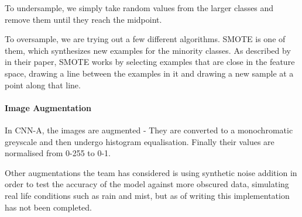 \documentclass[12pt, landscape]{article}
\begin{document}
\begin{multicols}{3}
To undersample, we simply take random values from the larger classes and remove
them until they reach the midpoint.

To oversample, we are trying out a few different algorithms. SMOTE is one of
them, which synthesizes new examples for the minority classes. As described by
\citep[Nitesh Chawla et al]{SMOTE} in their paper, SMOTE works by selecting
examples that are close in the feature space, drawing a line between the
examples in it and drawing a new sample at a point along that
line.


\paragraph{Image Augmentation}
In CNN-A, the images are augmented - They are converted to a
monochromatic greyscale and then undergo histogram equalisation. Finally
their values are normalised from 0-255 to 0-1.

Other augmentations the team has considered is using synthetic noise addition in
order to test the accuracy of the model against more obscured data, simulating
real life conditions such as rain and mist, but as of writing this
implementation has not been completed.



\end{multicols}
\end{document}
